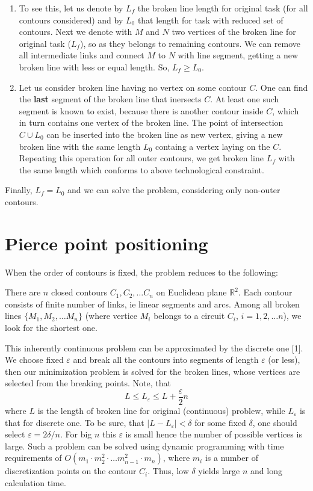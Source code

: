 \documentclass{../download/tPRS2e}
\begin{document}
\begin{enumerate}
    \item{}
To see this, let us denote by
$L_f$ the broken line length for original task
(for all contours considered)
and by 
$L_0$ that length for task with reduced set of contours.
Next we denote with $M$ and $N$
two vertices of the broken line for original task
($L_f$),
so as they belongs to remaining contours.
We can remove all intermediate links and connect 
$M$ to $N$ with line segment,
getting a new broken line with less or equal length.
So, $L_f \ge L_0$.
    \item{}
Let us consider broken line
having no vertex on some contour $C$.
One can find the \textbf{last} segment
of the broken line
that inersects $C$.
At least one such segment is known to exist,
because there is another contour inside $C$,
which in turn contains one vertex of the broken line.
The point of intersection $C \cup L_0$ can be inserted
into the broken line as new vertex,
giving a new broken line with the same length $L_0$
containg a vertex laying on the $C$.
Repeating this operation for all outer contours,
we get broken line $L_f$ with the same length
which conforms to above
technological constraint.
\end{enumerate}

Finally, $L_f = L_0$ and we can solve the problem,
considering only non-outer contours.

\section{Pierce point positioning}

When the order of contours is fixed,
the problem reduces to the following:

There are $n$ closed contours
$C_1, C_2, \dots C_n$ on Euclidean plane
$\mathbb R^2$.
Each contour consists of finite number of links,
ie linear segments and arcs.
Among all broken lines $\{M_1, M_2, \dots M_n\}$
(where vertice $M_i$ belongs to a circuit $C_i$,
$i = 1, 2, \dots n$),
we look for the shortest one.

This inherently continuous problem can be approximated
by the discrete one [1].
We choose fixed $\varepsilon$ and break all the contours
into segments of length $\varepsilon$ (or less),
then our minimization problem is solved for the 
broken lines, whose vertices are selected from the
breaking points. Note, that
$$
L \le L_\varepsilon \le L + \frac{\varepsilon}2 n
$$
where $L$ is the length of broken line for original
(continuous) problew,
while $L_\varepsilon$ is that for discrete one.
To be sure, that
$| L - L_\varepsilon | < \delta $
for some fixed $\delta$,
one should select $\varepsilon = 2 \delta /n$.
For big $n$ this $\varepsilon$ is small hence
the number of possible vertices is large.
Such a problem can be solved using dynamic programming
with time requirements of
$O(m_1 \cdot m_2^2 \cdot \dots m_{n-1}^2 \cdot m_n)$,
where $m_i$ is a number of discretization points on the
contour $C_i$.
Thus, low $\delta$ yields large $n$ and long
calculation time.
\end{document}
